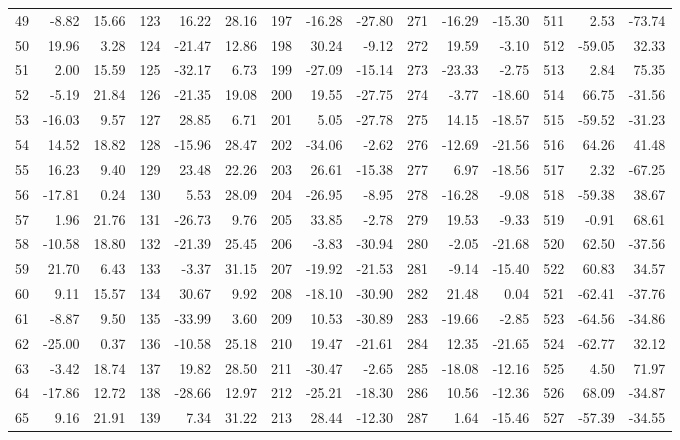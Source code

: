 \begin{table}[!h]
{\begin{tabular}{|r r r||r r r||r r r||r r r||r r r|}
49 &  -8.82 & 15.66 & 123 &  16.22 & 28.16 & 197 & -16.28 & -27.80 & 271 & -16.29 & -15.30 & 511 &   2.53 & -73.74 \\
50 &  19.96 &  3.28 & 124 & -21.47 & 12.86 & 198 &  30.24 &  -9.12 & 272 &  19.59 &  -3.10 & 512 & -59.05 &  32.33 \\
51 &   2.00 & 15.59 & 125 & -32.17 &  6.73 & 199 & -27.09 & -15.14 & 273 & -23.33 &  -2.75 & 513 &   2.84 &  75.35 \\
52 &  -5.19 & 21.84 & 126 & -21.35 & 19.08 & 200 &  19.55 & -27.75 & 274 &  -3.77 & -18.60 & 514 &  66.75 & -31.56 \\
53 & -16.03 &  9.57 & 127 &  28.85 &  6.71 & 201 &   5.05 & -27.78 & 275 &  14.15 & -18.57 & 515 & -59.52 & -31.23 \\
54 &  14.52 & 18.82 & 128 & -15.96 & 28.47 & 202 & -34.06 &  -2.62 & 276 & -12.69 & -21.56 & 516 &  64.26 &  41.48 \\
55 &  16.23 &  9.40 & 129 &  23.48 & 22.26 & 203 &  26.61 & -15.38 & 277 &   6.97 & -18.56 & 517 &   2.32 & -67.25 \\
56 & -17.81 &  0.24 & 130 &   5.53 & 28.09 & 204 & -26.95 &  -8.95 & 278 & -16.28 &  -9.08 & 518 & -59.38 &  38.67 \\
57 &   1.96 & 21.76 & 131 & -26.73 &  9.76 & 205 &  33.85 &  -2.78 & 279 &  19.53 &  -9.33 & 519 &  -0.91 &  68.61 \\
58 & -10.58 & 18.80 & 132 & -21.39 & 25.45 & 206 &  -3.83 & -30.94 & 280 &  -2.05 & -21.68 & 520 &  62.50 & -37.56 \\
59 &  21.70 &  6.43 & 133 &  -3.37 & 31.15 & 207 & -19.92 & -21.53 & 281 &  -9.14 & -15.40 & 522 &  60.83 &  34.57 \\
60 &   9.11 & 15.57 & 134 &  30.67 &  9.92 & 208 & -18.10 & -30.90 & 282 &  21.48 &   0.04 & 521 & -62.41 & -37.76 \\
61 &  -8.87 &  9.50 & 135 & -33.99 &  3.60 & 209 &  10.53 & -30.89 & 283 & -19.66 &  -2.85 & 523 & -64.56 & -34.86 \\
62 & -25.00 &  0.37 & 136 & -10.58 & 25.18 & 210 &  19.47 & -21.61 & 284 &  12.35 & -21.65 & 524 & -62.77 &  32.12 \\
63 &  -3.42 & 18.74 & 137 &  19.82 & 28.50 & 211 & -30.47 &  -2.65 & 285 & -18.08 & -12.16 & 525 &   4.50 &  71.97 \\
64 & -17.86 & 12.72 & 138 & -28.66 & 12.97 & 212 & -25.21 & -18.30 & 286 &  10.56 & -12.36 & 526 &  68.09 & -34.87 \\
65 &   9.16 & 21.91 & 139 &   7.34 & 31.22 & 213 &  28.44 & -12.30 & 287 &   1.64 & -15.46 & 527 & -57.39 & -34.55 \\

\end{tabular}}
\end{table}
